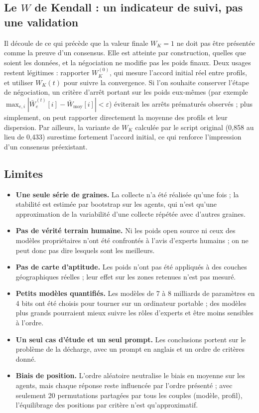 \documentclass[11pt,a4paper]{article}
\newcommand{\Wbar}{\bar{W}}
\newcommand{\Wmoy}{\bar{W}_{\mathrm{moy}}}
\begin{document}
\subsection{Le \texorpdfstring{$W$}{W} de Kendall : un indicateur de suivi, pas une validation}

Il découle de ce qui précède que la valeur finale $W_K=1$ ne doit pas être présentée comme la preuve d'un consensus. Elle est atteinte par construction, quelles que soient les données, et la négociation ne modifie pas les poids finaux. Deux usages restent légitimes : rapporter $W_K^{(0)}$, qui mesure l'accord initial réel entre profils, et utiliser $W_K(t)$ pour suivre la convergence. Si l'on souhaite conserver l'étape de négociation, un critère d'arrêt portant sur les poids eux-mêmes (par exemple $\max_{e,i}|\Wbar_e^{(t)}[i]-\Wmoy[i]|<\varepsilon$) éviterait les arrêts prématurés observés ; plus simplement, on peut rapporter directement la moyenne des profils et leur dispersion. Par ailleurs, la variante de $W_K$ calculée par le script original (0,858 au lieu de 0,433) surestime fortement l'accord initial, ce qui renforce l'impression d'un consensus préexistant.

\subsection{Limites}\label{sec:limites}

\begin{itemize}
  \item \textbf{Une seule série de graines.} La collecte n'a été réalisée qu'une fois ; la stabilité est estimée par bootstrap sur les agents, qui n'est qu'une approximation de la variabilité d'une collecte répétée avec d'autres graines.
  \item \textbf{Pas de vérité terrain humaine.} Ni les poids open source ni ceux des modèles propriétaires n'ont été confrontés à l'avis d'experts humains ; on ne peut donc pas dire lesquels sont les meilleurs.
  \item \textbf{Pas de carte d'aptitude.} Les poids n'ont pas été appliqués à des couches géographiques réelles ; leur effet sur les zones retenues n'est pas mesuré.
  \item \textbf{Petits modèles quantifiés.} Les modèles de 7 à 8 milliards de paramètres en 4 bits ont été choisis pour tourner sur un ordinateur portable ; des modèles plus grands pourraient mieux suivre les rôles d'experts et être moins sensibles à l'ordre.
  \item \textbf{Un seul cas d'étude et un seul prompt.} Les conclusions portent sur le problème de la décharge, avec un prompt en anglais et un ordre de critères donné.
  \item \textbf{Biais de position.} L'ordre aléatoire neutralise le biais en moyenne sur les agents, mais chaque réponse reste influencée par l'ordre présenté ; avec seulement 20 permutations partagées par tous les couples (modèle, profil), l'équilibrage des positions par critère n'est qu'approximatif.
\end{itemize}
\end{document}

